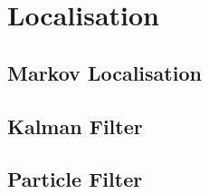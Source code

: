 \section{Localisation}
\lipsum[7] %

\subsection{Markov Localisation}


\subsection{Kalman Filter}
\lipsum[7] %

\subsection{Particle Filter}
\lipsum[7] %
